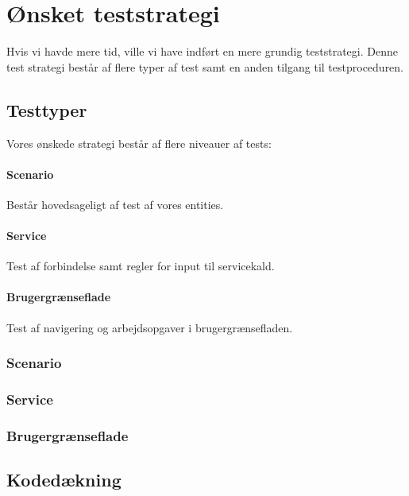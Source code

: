 \section{Ønsket teststrategi}
\label{Test_intendedStrat}
Hvis vi havde mere tid, ville vi have indført en mere grundig teststrategi. Denne test strategi består af flere typer af test samt en anden tilgang til testproceduren.

\subsection{Testtyper}
\label{Test_intendedStrat_types}
Vores ønskede strategi består af flere niveauer af tests:
\paragraph{Scenario} Består hovedsageligt af test af vores entities.
\paragraph{Service} Test af forbindelse samt regler for input til servicekald.
\paragraph{Brugergrænseflade} Test af navigering og arbejdsopgaver i brugergrænsefladen.

\subsubsection{Scenario}
\label{Test_intendedStrattypes_sce}

\subsubsection{Service}
\label{Test_intendedStrattypes_service}

\subsubsection{Brugergrænseflade}
\label{Test_intendedStrattypes_UI}

\subsection{Kodedækning}
\label{Test_intendedStrat_coverage}